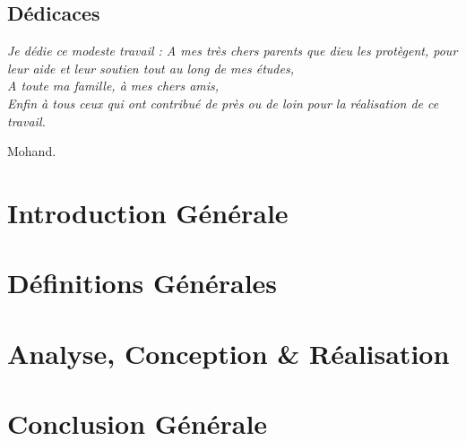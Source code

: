 \documentclass[11pt,a4paper,onecolumn,openright,oneside]{report}
\begin{document}
    \chapter*{\huge Dédicaces}
	
	\begin{center}
		\it \Large
		Je dédie ce modeste travail :
		A mes très chers parents que dieu les
		protègent, pour leur aide et leur soutien tout au long
		de mes études,\\
		
		A toute ma famille, à mes chers amis,\\
		
		Enfin à tous ceux qui ont contribué de près
		ou de loin pour la réalisation de ce travail.\\
		
		\leftskip=12cm
		
		Mohand.
		
		\leftskip=0cm
		
	\end{center}
	
	\tableofcontents
	\listoffigures
	\listoftables

	

	\pagestyle{fancy}
	\fancyhead{}
	
	\renewcommand{\chaptermark}[1]{\markboth{\bsc{\chaptername~\thechapter{} :} #1}{}}
	
	\lhead[\textsl{\rightmark}]{\textsl{\leftmark}}
	
	\renewcommand{\headrulewidth}{1.2pt}
	
	\newcommand\blfootnote[1]{
		\begingroup
		\renewcommand\thefootnote{}\footnote{#1}
		\addtocounter{footnote}{-1}
		\endgroup
	}

	\part*{Introduction Générale}
	
	\part{Définitions Générales}

	\part{Analyse, Conception \& Réalisation}
		

	\part*{Conclusion Générale}

	\leftskip=0cm
	\renewcommand{\bibname}{Référence bibliographique et webographique}
	
	
	
\end{document}

